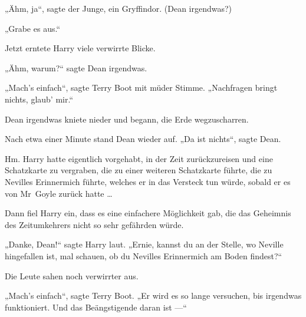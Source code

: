 „Ähm, ja“, sagte der Junge, ein Gryffindor. (Dean irgendwas?)

„Grabe es aus.“

Jetzt erntete Harry viele verwirrte Blicke.

„Ähm, warum?“ sagte Dean irgendwas.

„Mach’s einfach“, sagte Terry Boot mit müder Stimme.
„Nachfragen bringt nichts, glaub’ mir.“

Dean irgendwas kniete nieder und begann, die Erde wegzuscharren.

Nach etwa einer Minute stand Dean wieder auf.
„Da ist nichts“, sagte Dean.

Hm. Harry hatte eigentlich vorgehabt, in der Zeit zurückzureisen und eine Schatzkarte zu vergraben, die zu einer weiteren Schatzkarte führte, die zu Nevilles Erinnermich führte, welches er in das Versteck tun würde, sobald er es von Mr~Goyle zurück hatte …

Dann fiel Harry ein, dass es eine einfachere Möglichkeit gab, die das Geheimnis des Zeitumkehrers nicht so sehr gefährden würde.

„Danke, Dean!“ sagte Harry laut.
„Ernie, kannst du an der Stelle, wo Neville hingefallen ist, mal schauen, ob du Nevilles Erinnermich am Boden findest?“

Die Leute sahen noch verwirrter aus.

„Mach’s einfach“, sagte Terry Boot.
„Er wird es so lange versuchen, bis irgendwas funktioniert. Und das Beängstigende daran ist —“

